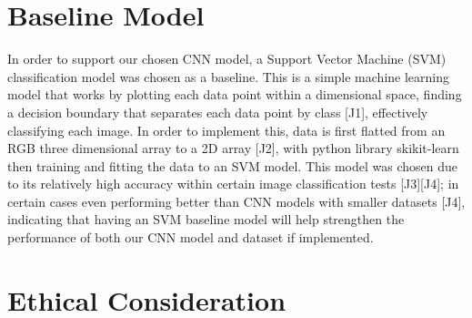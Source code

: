 \documentclass{article} %
\begin{document}
\section {Baseline Model}

In order to support our chosen CNN model, a Support Vector Machine (SVM) classification model was chosen as a baseline. This is a simple machine learning model that works by plotting each data point within a dimensional space, finding a decision boundary that separates each data point by class [J1], effectively classifying each image. In order to implement this, data is first flatted from an RGB three dimensional array to a 2D array [J2], with python library skikit-learn then training and fitting the data to an SVM model. This model was chosen due to its relatively high accuracy within certain image classification tests [J3][J4]; in certain cases even performing better than CNN models with smaller datasets [J4], indicating that having an SVM baseline model will help strengthen the performance of both our CNN model and dataset if implemented.

\section {Ethical Consideration}
\end{document}
